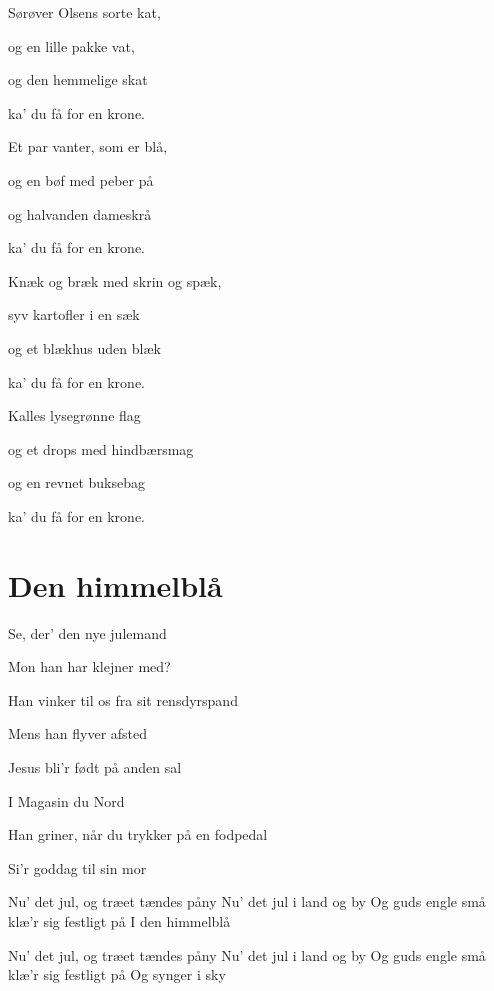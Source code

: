 \documentclass[11pt]{beamer}
\begin{document}
\begin{frame}
Sørøver Olsens sorte kat,

og en lille pakke vat,

og den hemmelige skat

ka’ du få for en krone.
\end{frame}

\begin{frame}
Et par vanter, som er blå,

og en bøf med peber på

og halvanden dameskrå

ka’ du få for en krone.
\end{frame}

\begin{frame}
Knæk og bræk med skrin og spæk,

syv kartofler i en sæk

og et blækhus uden blæk

ka’ du få for en krone.
\end{frame}

\begin{frame}
Kalles lysegrønne flag

og et drops med hindbærsmag

og en revnet buksebag

ka’ du få for en krone.
\end{frame}

\toc

\section{Den himmelblå}
\begin{frame}
Se, der' den nye julemand

Mon han har klejner med?

Han vinker til os fra sit rensdyrspand

Mens han flyver afsted
\end{frame}

\begin{frame}
Jesus bli'r født på anden sal

I Magasin du Nord

Han griner, når du trykker på en fodpedal

Si'r goddag til sin mor
\end{frame}

\begin{frame}
Nu' det jul, og træet tændes påny
Nu' det jul i land og by
Og guds engle små klæ'r sig festligt på
I den himmelblå
\end{frame}
\begin{frame}
Nu' det jul, og træet tændes påny
Nu' det jul i land og by
Og guds engle små klæ'r sig festligt på
Og synger i sky
\end{frame}
\end{document}
